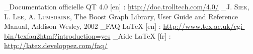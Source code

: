 \renewcommand\bibname{5. Bibliographie}


\begin{thebibliography}{99}
	\bibitem _Documentation officielle QT 4.0 [en] : \url{http://doc.trolltech.com/4.0/}
	\bibitem _J. \textsc{Siek}, L. \textsc{Lee}, A. \textsc{Lumsdaine}, The Boost Graph Library, User Guide and Reference Manual, Addison-Wesley, 2002 	
	\bibitem _FAQ LaTeX [en] : \url{http://www.tex.ac.uk/cgi-bin/texfaq2html?introduction=yes}	
	\bibitem _Aide LaTeX [fr] : \url{http://latex.developpez.com/faq/}
\end{thebibliography}